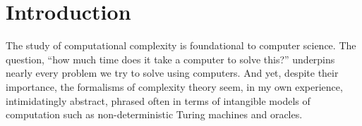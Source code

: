\chapter{Introduction}

The study of computational complexity is foundational to computer science. The
question, ``how much time does it take a computer to solve this?'' underpins
nearly every problem we try to solve using computers.  And yet, despite their
importance, the formalisms of complexity theory seem, in my own experience,
intimidatingly abstract, phrased often in terms of intangible models of
computation such as non-deterministic Turing machines and oracles.









%

